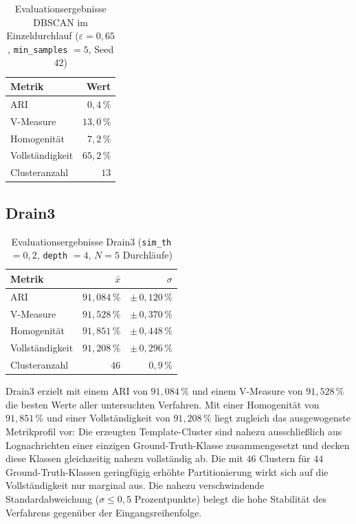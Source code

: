 \begin{table}[h]
    \centering
    \caption{Evaluationsergebnisse DBSCAN im Einzeldurchlauf ($\varepsilon = 0{,}65$, \texttt{min\_samples} $= 5$, Seed $42$)}
    \label{tab:eval:dbscan:single}
    \begin{tabular}{lr}
        \toprule
        Metrik & Wert \\
        \midrule
        ARI             & $0{,}4\,\%$ \\
        V-Measure       & $13{,}0\,\%$ \\
        Homogenität     & $7{,}2\,\%$ \\
        Vollständigkeit & $65{,}2\,\%$ \\
        \midrule
        Clusteranzahl   & $13$ \\
        \bottomrule
    \end{tabular}
\end{table}

\subsection{Drain3}
\label{sec:eval:drain3}

\begin{table}[h]
    \centering
    \caption{Evaluationsergebnisse Drain3 (\texttt{sim\_th} $= 0{,}2$, \texttt{depth} $= 4$, $N = 5$ Durchläufe)}
    \label{tab:eval:drain3}
    \begin{tabular}{lrr}
        \toprule
        Metrik & $\bar{x}$ & $\sigma$ \\
        \midrule
        ARI            & $91{,}084\,\%$ & $\pm\,0{,}120\,\%$ \\
        V-Measure      & $91{,}528\,\%$ & $\pm\,0{,}370\,\%$ \\
        Homogenität    & $91{,}851\,\%$ & $\pm\,0{,}448\,\%$ \\
        Vollständigkeit& $91{,}208\,\%$ & $\pm\,0{,}296\,\%$ \\
        \midrule
        Clusteranzahl  & $46$ & $0{,}9\,\%$ \\
        \bottomrule
    \end{tabular}
\end{table}

Drain3 erzielt mit einem ARI von $91{,}084\,\%$ und einem V-Measure von
$91{,}528\,\%$ die besten Werte aller untersuchten Verfahren. Mit einer
Homogenität von $91{,}851\,\%$ und einer Vollständigkeit von $91{,}208\,\%$
liegt zugleich das ausgewogenste Metrikprofil vor: Die erzeugten
Template-Cluster sind nahezu ausschließlich aus Lognachrichten einer
einzigen Ground-Truth-Klasse zusammengesetzt und decken diese Klassen
gleichzeitig nahezu vollständig ab. Die mit $46$ Clustern für $44$
Ground-Truth-Klassen geringfügig erhöhte Partitionierung wirkt sich auf die
Vollständigkeit nur marginal aus. Die nahezu verschwindende
Standardabweichung ($\sigma \leq 0{,}5$ Prozentpunkte) belegt die hohe
Stabilität des Verfahrens gegenüber der Eingangsreihenfolge.

